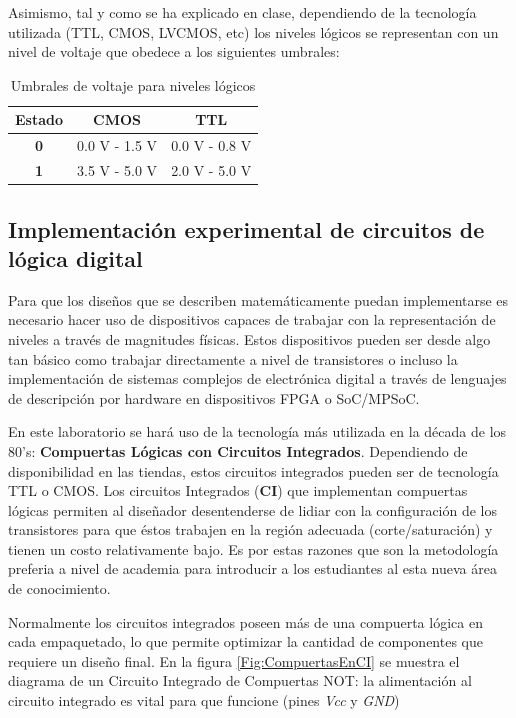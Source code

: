 Asimismo, tal y como se ha explicado en clase, dependiendo de la tecnología utilizada (TTL, CMOS, LVCMOS, etc) los niveles
lógicos se representan con un nivel de voltaje que obedece a los siguientes umbrales:

\begin{table}[H]
    \centering
    \begin{tabular}{|c|c|c|}
        \hline
        \textbf{Estado} & \textbf{CMOS} & \textbf{TTL}  \\ \hline
        \textbf{0}      & 0.0 V - 1.5 V & 0.0 V - 0.8 V \\ \hline
        \textbf{1}      & 3.5 V - 5.0 V & 2.0 V - 5.0 V \\ \hline
    \end{tabular}
    \caption{Umbrales de voltaje para niveles lógicos}
    \label{table:umbralesLogicos}
\end{table}

\subsection{Implementación experimental de circuitos de lógica digital}
Para que los diseños que se describen matemáticamente puedan implementarse es necesario hacer uso de dispositivos capaces
de trabajar con la representación de niveles a través de magnitudes físicas. Estos dispositivos pueden ser desde algo tan 
básico como trabajar directamente a nivel de transistores o incluso la implementación de sistemas complejos de electrónica digital
a través de lenguajes de descripción por hardware en dispositivos FPGA o SoC/MPSoC.

En este laboratorio se hará uso de la tecnología más utilizada en la década de los 80's: 
\textbf{Compuertas Lógicas con Circuitos Integrados}. Dependiendo de disponibilidad en las tiendas, estos circuitos integrados
pueden ser de tecnología TTL o CMOS. Los circuitos Integrados (\textbf{CI}) que implementan compuertas lógicas permiten al diseñador
desentenderse de lidiar con la configuración de los transistores para que éstos trabajen en la región adecuada (corte/saturación)
y tienen un costo relativamente bajo. Es por estas razones que son la metodología preferia a nivel de academia para introducir a
los estudiantes al esta nueva área de conocimiento.

Normalmente los circuitos integrados poseen más de una compuerta lógica en cada empaquetado, lo que permite optimizar la cantidad de
componentes que requiere un diseño final. En la figura \ref{Fig:CompuertasEnCI} se muestra el diagrama de un Circuito Integrado de
Compuertas NOT: la alimentación al circuito integrado es vital para que funcione (pines \textit{Vcc} y \textit{GND})

